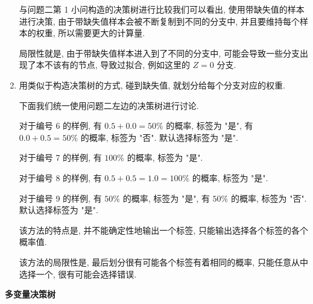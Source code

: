 \documentclass[answers]{exam}  %
\begin{document}
\begin{questions}
\begin{solution}
\begin{enumerate}
            与问题二第 1 小问构造的决策树进行比较我们可以看出, 使用带缺失值的样本进行决策, 由于带缺失值样本会被不断复制到不同的分支中, 并且要维持每个样本的权重, 所以需要更大的计算量.

            局限性就是, 由于带缺失值样本进入到了不同的分支中, 可能会导致一些分支出现了本不该有的节点, 导致过拟合, 例如这里的 $Z = 0$ 分支.

      \item

            用类似于构造决策树的方式, 碰到缺失值, 就划分给每个分支对应的权重.

            下面我们统一使用问题二左边的决策树进行讨论.

            对于编号 6 的样例, 有 $0.5 + 0.0 = 50\%$ 的概率, 标签为 "是", 有 $0.0 + 0.5 = 50\%$ 的概率, 标签为 "否". 默认选择标签为 "是".

            对于编号 7 的样例, 有 $100\%$ 的概率, 标签为 "是".

            对于编号 8 的样例, 有 $0.5 + 0.5 = 1.0 = 100\%$ 的概率, 标签为 "是".

            对于编号 9 的样例, 有 $50\%$ 的概率, 标签为 "是", 有 $50\%$ 的概率, 标签为 "否". 默认选择标签为 "是".

            该方法的特点是, 并不能确定性地输出一个标签, 只能输出选择各个标签的各个概率值.

            该方法的局限性是, 最后划分很有可能各个标签有着相同的概率, 只能任意从中选择一个, 很有可能会选择错误.

    \end{enumerate}
  \end{solution}


  \question [20] \textbf{多变量决策树}


\end{questions}
\end{document}
